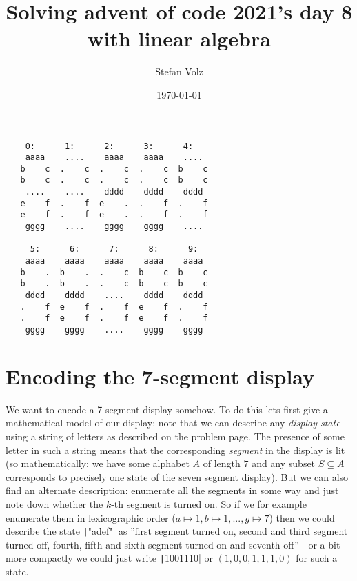 \documentclass[a4paper,11pt]{article}
\begin{document}
\title{Solving advent of code 2021's day 8 with linear algebra}

\author{Stefan Volz}

\date{\today}

\maketitle

\begin{center}
    \begin{verbatim}
    0:      1:      2:      3:      4:
    aaaa    ....    aaaa    aaaa    ....
   b    c  .    c  .    c  .    c  b    c
   b    c  .    c  .    c  .    c  b    c
    ....    ....    dddd    dddd    dddd
   e    f  .    f  e    .  .    f  .    f
   e    f  .    f  e    .  .    f  .    f
    gggg    ....    gggg    gggg    ....
   
     5:      6:      7:      8:      9:
    aaaa    aaaa    aaaa    aaaa    aaaa
   b    .  b    .  .    c  b    c  b    c
   b    .  b    .  .    c  b    c  b    c
    dddd    dddd    ....    dddd    dddd
   .    f  e    f  .    f  e    f  .    f
   .    f  e    f  .    f  e    f  .    f
    gggg    gggg    ....    gggg    gggg
\end{verbatim}
\end{center}


\section{Encoding the 7-segment display}

We want to encode a 7-segment display somehow. To do this lets first give a mathematical model of our display: note that we can describe any \emph{display state} using a string of letters as described on the problem page. The presence of some letter in such a string means that the corresponding \emph{segment} in the display is lit (so mathematically: we have some alphabet $A$ of length $7$ and any subset $S \subseteq A$ corresponds to precisely one state of the seven segment display). But we can also find an alternate description: enumerate all the segments in some way and just note down whether the $k$-th segment is turned on. So if we for example enumerate them in lexicographic order ($a \mapsto 1, b \mapsto 1, ..., g \mapsto 7$) then we could describe the state \texttt|"adef"| as ''first segment turned on, second and third segment turned off, fourth, fifth and sixth segment turned on and seventh off'' - or a bit more compactly we could just write \texttt|1001110| or $(1,0,0,1,1,1,0)$ for such a state.
\end{document}
